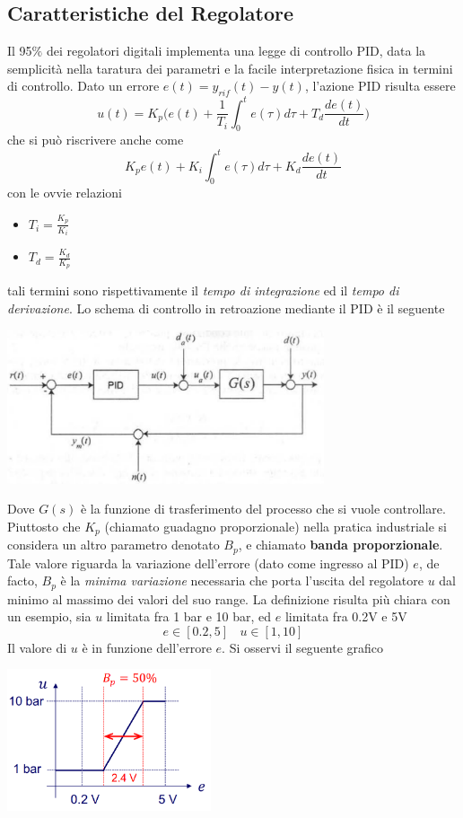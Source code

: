 \documentclass[10pt, letterpaper]{report}
\begin{document}
\subsection{Caratteristiche del Regolatore}
Il 95$\%$ dei regolatori digitali implementa una legge di controllo PID, data la semplicità nella taratura dei parametri e la facile interpretazione fisica in termini di controllo. Dato un errore $e(t)=y_{rif}(t)-y(t)$, l'azione PID risulta essere 
$$ 
u(t)=K_p\Big(   e(t)+\frac{1}{T_i}\int_0^te(\tau)d\tau + T_d\frac{de(t)}{dt}    \Big)
$$
che si può riscrivere anche come 
$$
K_pe(t)+K_i\int_0^te(\tau)d\tau + K_d\frac{de(t)}{dt} 
$$
con le ovvie relazioni \begin{itemize}\item$T_i=\frac{K_p}{K_i}$\item $T_d=\frac{K_d}{K_p}$\end{itemize} tali termini sono rispettivamente il \textit{tempo di integrazione} ed il  \textit{tempo di derivazione}.\acc 
Lo schema di controllo in retroazione mediante il PID è il seguente
\begin{center}
    \includegraphics[width=0.7\textwidth]{images/schemaControlloPID.png} 
\end{center}
Dove $G(s)$ è la funzione di trasferimento del processo che si vuole controllare.
\acc
Piuttosto che $K_p$ (chiamato guadagno proporzionale) nella pratica industriale si considera un altro parametro denotato $B_p$, e chiamato \textbf{banda proporzionale}. Tale valore riguarda la variazione dell'errore (dato come ingresso al PID) $e$, de facto, $B_p$ è la \textit{minima variazione} necessaria che porta l'uscita del regolatore $u$ dal minimo al massimo dei valori del suo range.\acc 
La definizione risulta più chiara con un esempio, sia $u$ limitata fra 1 bar e 10 bar, ed $e$ limitata fra 0.2V e 5V 
$$ e\in [0.2,5]\ \ \ \ u\in[1,10]$$
Il valore di $u$ è in funzione dell'errore $e$. Si osservi il seguente grafico
\begin{center}
    \includegraphics[width=0.45\textwidth]{images/bandaproporzionale1.png} 
\end{center}
\end{document}
